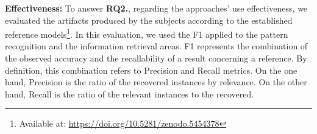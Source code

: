 \textbf{Effectiveness:} 
To answer \textbf{RQ2.}, regarding the approaches' use effectiveness, we evaluated the artifacts produced by the subjects according to the established reference models\footnote{Available at: \url{https://doi.org/10.5281/zenodo.5454378}}. 
In this evaluation, we used the F1 applied to the pattern recognition and the information retrieval areas.
F1 represents the combination of the observed accuracy and the recallability of a result concerning a reference.
By definition, this combination refers to Precision and Recall metrics. On the one hand, Precision is the ratio of the recovered instances by relevance. On the other hand, Recall is the ratio of the relevant instances to the recovered.

